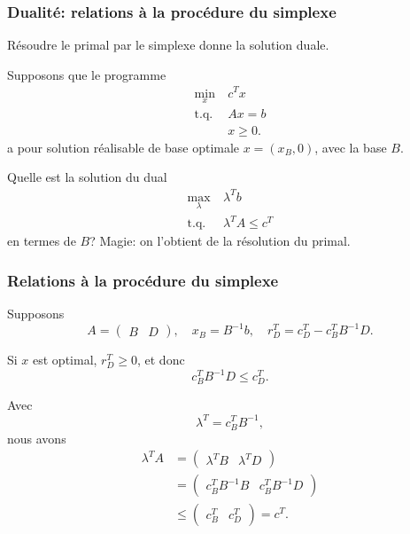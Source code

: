 \documentclass[usepdftitle=false]{beamer}
\begin{document}
\begin{frame}
	\frametitle{Dualité: relations à la procédure du simplexe}
	
	Résoudre le primal par le simplexe donne la solution duale.
	
	\mbox{}
	
	Supposons que le programme
	\begin{align*}
		\min_x \ & c^Tx \\
		\mbox{t.q. } & Ax = b\\
		& x \geq 0.
	\end{align*}
	a pour solution réalisable de base optimale $x = (x_{B},0)$, avec la base $B$.
	
	\mbox{}
	
	Quelle est la solution du dual
	\begin{align*}
		\max_{\lambda} \ & \lambda^T b \\
		\mbox{t.q. } & \lambda^T A \leq c^T
	\end{align*}
	en termes de $B$? Magie: on l'obtient de la résolution du primal.
	
	
\end{frame}

\begin{frame}
	\frametitle{Relations à la procédure du simplexe}
	
	Supposons
	\[
	A = \begin{pmatrix}
		B & D
	\end{pmatrix},
	\quad
	x_B = B^{-1}b,
	\quad
	r_D^T = c_D^T - c_B^T B^{-1} D.
	\]
	
	\mbox{}
	
	Si $x$ est optimal, $r_D^T \geq 0$, et donc
	\[
	c_B^T B^{-1} D \leq c_D^T.
	\]
	
	\mbox{}
	
	Avec
	\[
	\lambda^T = c_B^T B^{-1},
	\]
	nous avons
	\begin{align*}
		\lambda^T A &=
		\begin{pmatrix}
			\lambda^T B & \lambda^T D
		\end{pmatrix} \\
		&= \begin{pmatrix}
			c_B^T B^{-1}B & c_B^T B^{-1} D
		\end{pmatrix} \\
		&\leq \begin{pmatrix}
			c_B^T & c_D^T
		\end{pmatrix} = c^T.
	\end{align*}
	
\end{frame}
\end{document}
